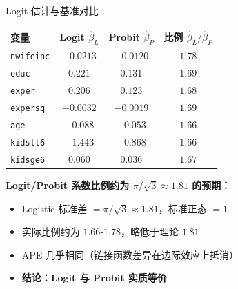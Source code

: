 \documentclass[aspectratio=169, 10pt]{beamer}
\begin{document}
\begin{frame}{Logit 估计与基准对比}

  \begin{center}\footnotesize
  \begin{tabular}{l|c|c|c}
  \hline
  变量 & Logit $\hat\beta_L$ & Probit $\hat\beta_P$ & 比例 $\hat\beta_L/\hat\beta_P$ \\
  \hline
  \texttt{nwifeinc} & $-0.0213$ & $-0.0120$ & $1.78$ \\
  \texttt{educ} & $0.221$ & $0.131$ & $1.69$ \\
  \texttt{exper} & $0.206$ & $0.123$ & $1.68$ \\
  \texttt{expersq} & $-0.0032$ & $-0.0019$ & $1.69$ \\
  \texttt{age} & $-0.088$ & $-0.053$ & $1.66$ \\
  \texttt{kidslt6} & $-1.443$ & $-0.868$ & $1.66$ \\
  \texttt{kidsge6} & $0.060$ & $0.036$ & $1.67$ \\
  \hline
  \end{tabular}
  \end{center}

  \begin{highlightbox}
    \textbf{Logit/Probit 系数比例约为 $\pi/\sqrt{3} \approx 1.81$ 的预期：}
    \begin{itemize}\setlength{\itemsep}{1pt}
      \item Logistic 标准差 $= \pi/\sqrt{3} \approx 1.81$，标准正态 $= 1$
      \item 实际比例约为 $1.66$-$1.78$，略低于理论 $1.81$
      \item APE 几乎相同（链接函数差异在边际效应上抵消）
      \item \textbf{结论：Logit 与 Probit 实质等价}
    \end{itemize}
  \end{highlightbox}

\end{frame}
\end{document}
